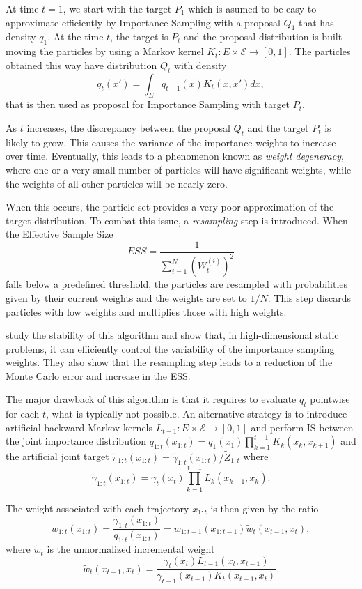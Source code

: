 \documentclass[a4paper, 12pt]{article}
\begin{document}
    At time $t=1$, we start with the target $P_1$ which is asumed to be easy to approximate efficiently by Importance Sampling with a proposal $Q_1$ that has density $q_1$. At the time $t$, the target is $P_t$ and the proposal distribution is built moving the particles by using a Markov kernel $K_t : E \times \mathcal{E} \rightarrow [0,1]$. The particles obtained this way have distribution $Q_t$ with density
    \[
        q_t(x') = \int_E q_{t-1}(x) K_t(x, x') d x,
    \] 
    that is then used as proposal for Importance Sampling with target $P_t$.

    As $t$ increases, the discrepancy between the proposal $Q_t$ and the target $P_t$ is likely to grow. This causes the variance of the importance weights to increase over time. Eventually, this leads to a phenomenon known as \emph{weight degeneracy}, where one or a very small number of particles will have significant weights, while the weights of all other particles will be nearly zero.

    When this occurs, the particle set provides a very poor approximation of the target distribution. To combat this issue, a \emph{resampling} step is introduced. When the Effective Sample Size
    \[
        ESS = \dfrac{1}{\sum_{i=1}^N (W_t^{(i)})^2}
    \] 
    falls below a predefined threshold, the particles are resampled with probabilities given by their current weights and the weights are set to $1/N$. This step discards particles with low weights and multiplies those with high weights.

    \cite{Beskos2014} study the stability of this algorithm and show that, in high-dimensional static problems, it can efficiently control the variability of the importance sampling weights. They also show that the resampling step leads to a reduction of the Monte Carlo error and increase in the ESS.

    The major drawback of this algorithm is that it requires to evaluate $q_t$ pointwise for each $t$, what is typically not possible. An alternative strategy \citep{DelMoral2006} is to introduce artificial backward Markov kernels $L_{t-1}: E \times \mathcal{E} \rightarrow [0,1]$ and perform IS between the joint importance distribution $q_{1:t}(x_{1:t}) = q_1(x_1) \prod_{k=1}^{t-1} K_k(x_k, x_{k+1})$ and the artificial joint target $\tilde{\pi}_{1:t}(x_{1:t}) = \tilde{\gamma}_{1:t}(x_{1:t})/\tilde{Z}_{1:t}$ where
    \[
        \tilde{\gamma}_{1:t}(x_{1:t}) = \gamma_t(x_t) \prod_{k=1}^{t-1} L_k(x_{k+1}, x_k).
    \]

    The weight associated with each trajectory $x_{1:t}$ is then given by the ratio
    \[
        w_{1:t}(x_{1:t}) = \frac{\tilde{\gamma}_{1:t}(x_{1:t})}{q_{1:t}(x_{1:t})} = w_{1:t-1}(x_{1:t-1}) \tilde{w}_t(x_{t-1}, x_t),
    \]
    where $\tilde{w}_t$ is the unnormalized incremental weight
    \[
        \tilde{w}_t(x_{t-1}, x_t) = \dfrac{\gamma_t(x_t) L_{t-1}(x_t, x_{t-1})}{\gamma_{t-1}(x_{t-1})K_t(x_{t-1}, x_t)}.
    \]
    
\end{document}
